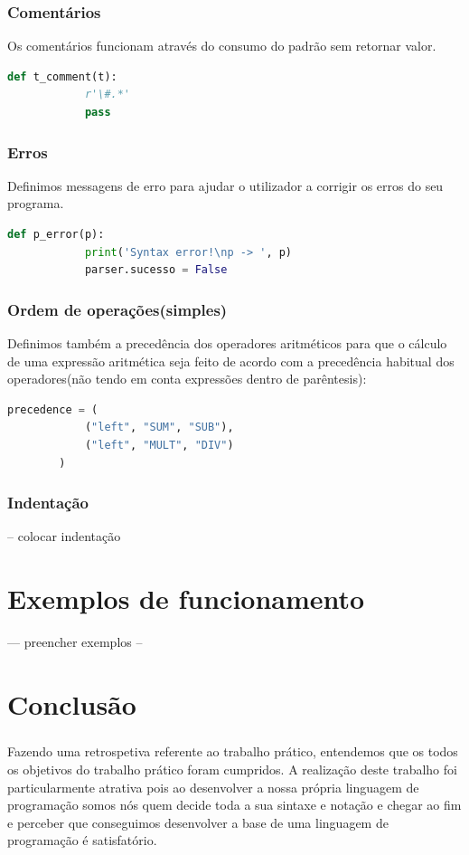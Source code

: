 \documentclass[11pt,a4paper]{report}
\begin{document}
    \subsection{Comentários}
    Os comentários funcionam através do consumo do padrão sem retornar valor.
    \begin{lstlisting}[language=Python]
        def t_comment(t):
            r'\#.*'
            pass
    \end{lstlisting}

    \subsection{Erros}
    Definimos messagens de erro para ajudar o utilizador a corrigir os erros do seu programa.
    \begin{lstlisting}[language=Python]
        def p_error(p):
            print('Syntax error!\np -> ', p)
            parser.sucesso = False
    \end{lstlisting}

    \subsection{Ordem de operações(simples)}
    Definimos também a precedência dos operadores aritméticos para que o cálculo de uma expressão aritmética seja
     feito de acordo com a precedência habitual dos operadores(não tendo em conta expressões dentro de parêntesis):
    \begin{lstlisting}[language=Python]
        precedence = (
            ("left", "SUM", "SUB"),
            ("left", "MULT", "DIV")
        )
    \end{lstlisting}

    \subsection{Indentação}
    -- colocar indentação


    \chapter{Exemplos de funcionamento}
    --- preencher exemplos -- 


\chapter{Conclusão}
\paragraph{}
Fazendo uma retrospetiva referente ao trabalho prático, entendemos que os todos os objetivos do trabalho prático foram cumpridos. A realização deste trabalho foi particularmente atrativa pois ao desenvolver a nossa própria linguagem de programação somos nós quem decide toda a sua sintaxe e notação e chegar ao fim e perceber que conseguimos desenvolver a base de uma linguagem de programação é satisfatório.
\end{document}
